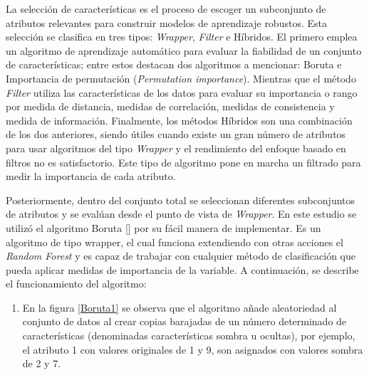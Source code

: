 \begin{enumerate}
    La selección de características es el proceso de escoger un subconjunto de atributos relevantes para construir modelos de aprendizaje robustos. Esta selección se clasifica en tres tipos: \textit{Wrapper}, \textit{Filter} e Híbridos. El primero emplea un algoritmo de aprendizaje automático para evaluar la fiabilidad de un conjunto de características; entre estos destacan dos algoritmos a mencionar: Boruta e Importancia de permutación (\textit{Permutation importance}). Mientras que el método \textit{Filter} utiliza las características de los datos para evaluar su importancia o rango por medida de distancia, medidas de correlación, medidas de consistencia y medida de información. Finalmente, los métodos Híbridos son una combinación de los dos anteriores, siendo útiles cuando existe un gran número de atributos para usar algoritmos del tipo \textit{Wrapper} y el rendimiento del enfoque basado en filtros no es satisfactorio. Este tipo de algoritmo pone en marcha un filtrado para medir la importancia de cada atributo.   
    
    Posteriormente, dentro del conjunto total se seleccionan diferentes subconjuntos de atributos y se evalúan desde el punto de vista de \textit{Wrapper}.
    En este estudio se utilizó el algoritmo Boruta [\cite{andreaperlato}] por su fácil manera de implementar. Es un algoritmo de tipo wrapper, el cual funciona extendiendo con otras acciones el \textit{Random Forest} y es capaz de trabajar con cualquier método de clasificación que pueda aplicar medidas de importancia de la variable. A continuación, se describe el funcionamiento del algoritmo:  


    


    \begin{enumerate}
        \item En la figura \ref{Boruta1} se observa que el algoritmo añade aleatoriedad al conjunto de datos al crear copias barajadas de un número determinado de características (denominadas características sombra u ocultas), por ejemplo, el atributo 1 con valores originales de 1 y 9, son asignados con valores sombra de 2 y 7. 
        

\end{enumerate}
\end{enumerate}
